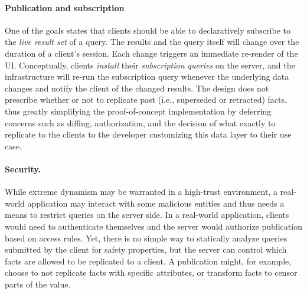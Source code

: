 \paragraph{Publication and subscription}

One of the goals states that clients should be able to declaratively subscribe to the \emph{live result set} of a query. The results and the query itself will change over the duration of a client's session. Each change triggers an immediate re-render of the UI. Conceptually, clients \emph{install} their \emph{subscription queries} on the server, and the infrastructure will re-run the subscription query whenever the underlying data changes and notify the client of the changed results. The design does not prescribe whether or not to replicate past (i.e., superseded or retracted) facts, thus greatly simplifying the proof-of-concept implementation by deferring concerns such as diffing, authorization, and the decision of what exactly to replicate to the clients to the developer customizing this data layer to their use case.

\paragraph{Security.} While extreme dynamism may be warranted in a high-trust environment, a real-world application may interact with some malicious entities and thus needs a means to restrict queries on the server side. In a real-world application, clients would need to authenticate themselves and the server would authorize publication based on access rules. Yet, there is no simple way to statically analyze queries submitted by the client for safety properties, but the server can control which facts are allowed to be replicated to a client. A publication might, for example, choose to not replicate facts with specific attributes, or transform facts to censor parts of the value.
